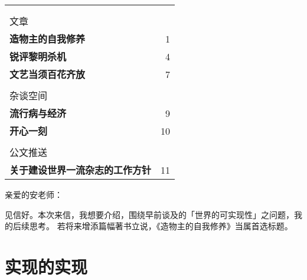 \noindent\begin{minipage}{\linewidth}
	\vspace{20mm}\par
	\center
	\par

	\tabcolsep=0pt
	\renewcommand{\arraystretch}{1.3}
	\noindent\begin{tabular}{lr}
		{\hspace{140mm}}                        & {} \\
		{}                                      & {} \\
		{\footnotesize\sffamily 文章}           & {} \\
		\hline
		\textbf{造物主的自我修养}               & 1  \\
		\textbf{锐评黎明杀机}                   & 4  \\
		\textbf{文艺当须百花齐放}               & 7  \\
		{}                                      & {} \\
		{\footnotesize\sffamily 杂谈空间}       & {} \\
		\hline
		\textbf{流行病与经济}                   & 9  \\
		\textbf{开心一刻}                       & 10 \\
		{}                                      & {} \\
		{\footnotesize\sffamily 公文推送}       & {} \\
		\hline
		\textbf{关于建设世界一流杂志的工作方针} & 11 \\
	\end{tabular}
\end{minipage}









\renewcommand{\fontforsection}[0]{\normalsize\bfseries}


\noindent
亲爱的安老师：

见信好。本次来信，我想要介绍，围绕早前谈及的「世界的可实现性」之问题，我的后续思考。
若将来增添篇幅著书立说，《造物主的自我修养》当属首选标题。

\section{实现的实现}

